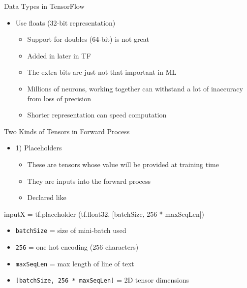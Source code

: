 \documentclass[aspectratio=169]{beamer}
\begin{document}
\begin{frame}{Data Types in TensorFlow}

\begin{itemize}
\item Use floats (32-bit representation)
	\begin{itemize}
	\item Support for doubles (64-bit) is not great
	\item Added in later in TF
	\item The extra bits are just not that important in ML
	\item Millions of neurons, working together can withstand a lot of inaccuracy from loss of precision
	\item Shorter representation can speed computation
	\end{itemize}
\end{itemize}
\end{frame}
\begin{frame}[fragile]{Two Kinds of Tensors in Forward Process}

\begin{itemize}
\item 1) Placeholders
\begin{itemize}
\item These are tensors whose value will be provided at training time
\item They are inputs into the forward process
\item Declared like 
\end{itemize}
\end{itemize}
\begin{SQL} 
inputX = tf.placeholder
  (tf.float32, [batchSize, 256 * maxSeqLen])
\end{SQL}
\begin{itemize}
\item \texttt{batchSize} = size of mini-batch used 
\item \texttt{256} = one hot encoding (256 characters)
\item \texttt{maxSeqLen} = max length of line of text
\item \texttt{[batchSize, 256 * maxSeqLen]} = 2D tensor dimensions
\end{itemize}
\end{frame}
\end{document}
